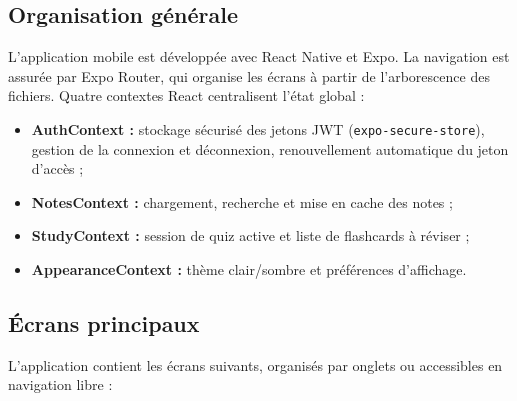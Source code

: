 \documentclass[12pt,a4paper]{report}
\begin{document}
\subsection{Organisation générale}

L'application mobile est développée avec React Native et Expo. La navigation est assurée par Expo Router, qui organise les écrans à partir de l'arborescence des fichiers. Quatre contextes React centralisent l'état global :

\begin{itemize}[label=--]
    \item \textbf{AuthContext :} stockage sécurisé des jetons JWT (\texttt{expo-secure-store}), gestion de la connexion et déconnexion, renouvellement automatique du jeton d'accès ;
    \item \textbf{NotesContext :} chargement, recherche et mise en cache des notes ;
    \item \textbf{StudyContext :} session de quiz active et liste de flashcards à réviser ;
    \item \textbf{AppearanceContext :} thème clair/sombre et préférences d'affichage.
\end{itemize}

\subsection{Écrans principaux}

L'application contient les écrans suivants, organisés par onglets ou accessibles en navigation libre :
\end{document}
